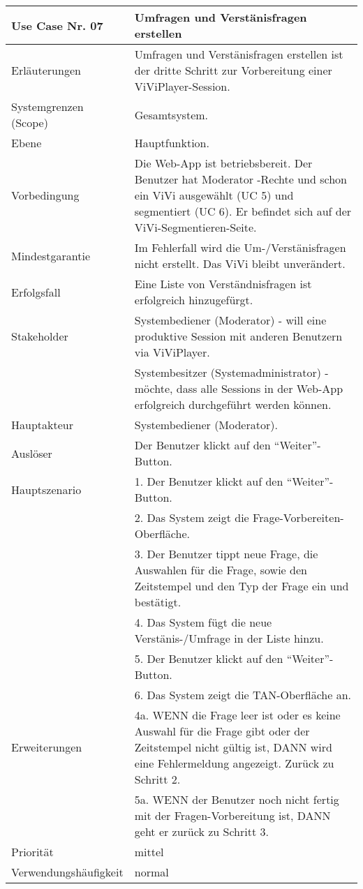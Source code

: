 \begin{tabularx}{\linewidth}{|l|X|}
	\hline
	Use Case Nr. 07			& \textbf{Umfragen und Verstänisfragen erstellen} \\ \hline
	Erläuterungen			& Umfragen und Verstänisfragen erstellen ist der dritte Schritt zur
							  Vorbereitung einer ViViPlayer-Session. \\ \hline
	Systemgrenzen (Scope)	& Gesamtsystem. \\ \hline
	Ebene					& Hauptfunktion. \\ \hline
	Vorbedingung			& Die Web-App ist betriebsbereit. Der Benutzer hat Moderator
							  -Rechte und schon ein ViVi ausgewählt (UC 5) und segmentiert (UC 6). Er befindet sich auf der ViVi-Segmentieren-Seite. \\ \hline
	Mindestgarantie			& Im Fehlerfall wird die Um-/Verstänisfragen nicht erstellt. Das ViVi 
							  bleibt unverändert. \\ \hline
	Erfolgsfall    			& Eine Liste von Verständnisfragen ist erfolgreich hinzugefürgt.
							  \\ \hline
	Stakeholder				& Systembediener (Moderator) - will eine produktive Session mit 
							  anderen Benutzern via ViViPlayer. \\
							& Systembesitzer (Systemadministrator) - möchte, dass alle Sessions 
							  in der Web-App erfolgreich durchgeführt werden können. \\ \hline
	Hauptakteur				& Systembediener (Moderator). \\ \hline
	Auslöser				& Der Benutzer klickt auf den ``Weiter''-Button. \\ \hline	
	Hauptszenario			& 1. Der Benutzer klickt auf den ``Weiter''-Button. \\  
							& 2. Das System zeigt die Frage-Vorbereiten-Oberfläche. \\
							& 3. Der Benutzer tippt neue Frage, die Auswahlen für die 
							  Frage, sowie den Zeitstempel und den Typ der Frage ein und 
							  bestätigt. \\ 
							& 4. Das System fügt die neue Verstänis-/Umfrage in der Liste
							  hinzu. \\ 
							& 5. Der Benutzer klickt auf den ``Weiter''-Button. \\ 
							& 6. Das System zeigt die TAN-Oberfläche an. \\ \hline
	Erweiterungen			& 4a. WENN die Frage leer ist oder es keine Auswahl für die 
							  Frage gibt oder der Zeitstempel nicht gültig ist, DANN wird eine 
							  Fehlermeldung angezeigt. Zurück zu Schritt 2. \\ 
							& 5a. WENN der Benutzer noch nicht fertig mit der 
							  Fragen-Vorbereitung ist, DANN geht er zurück zu Schritt 3. \\ \hline
	Priorität				& mittel \\ \hline
	Verwendungshäufigkeit	& normal \\ \hline
\end{tabularx}